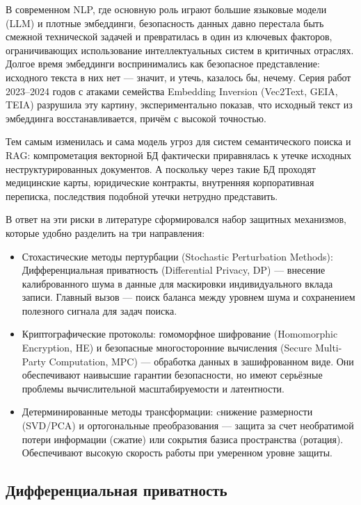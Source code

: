 \documentclass[a4paper, 12pt, oneside, openany]{article}
\begin{document}
В современном NLP, где основную роль играют большие языковые модели (LLM) и плотные эмбеддинги, безопасность данных давно перестала быть смежной технической задачей и превратилась в один из ключевых факторов, ограничивающих использование интеллектуальных систем в критичных отраслях. Долгое время эмбеддинги воспринимались как безопасное представление: исходного текста в них нет — значит, и утечь, казалось бы, нечему. Серия работ 2023–2024 годов с атаками семейства Embedding Inversion (Vec2Text, GEIA, TEIA) разрушила эту картину, экспериментально показав, что исходный текст из эмбеддинга восстанавливается, причём с высокой точностью.

Тем самым изменилась и сама модель угроз для систем семантического поиска и RAG: компрометация векторной БД фактически приравнялась к утечке исходных неструктурированных документов. А поскольку через такие БД проходят медицинские карты, юридические контракты, внутренняя корпоративная переписка, последствия подобной утечки нетрудно представить.

В ответ на эти риски в литературе сформировался набор защитных механизмов, которые удобно разделить на три направления:
\begin{itemize}
	\item
	Стохастические методы пертурбации (Stochastic Perturbation Methods): Диф\-фе\-рен\-ци\-аль\-ная при\-ват\-ность (Differential Privacy, DP) --- внесение калиброванного шума в данные для маскировки индивидуального вклада записи. Главный вызов --- поиск баланса между уровнем шума и сохранением полезного сигнала для задач поиска.
	\item
	Криптографические протоколы: гомоморфное шифрование (Homomorphic Encryption, HE) и безопасные мно\-го\-сто\-рон\-ние вы\-чис\-ле\-ния (Secure Multi-Party Computation, MPC) --- обработка данных в зашифрованном виде. Они обеспечивают наивысшие гарантии безопасности, но имеют серьёзные проблемы вычислительной масштабируемости и латентности.
	\item
	Детерминированные методы трансформации: cнижение размерности (SVD/PCA) и ортогональные преобразования --- защита за счет необратимой потери информации (сжатие) или сокрытия базиса пространства (ротация). Обеспечивают высокую скорость работы при умеренном уровне защиты.
\end{itemize}

\subsection{Диф\-фе\-рен\-ци\-аль\-ная при\-ват\-ность}
\end{document}
